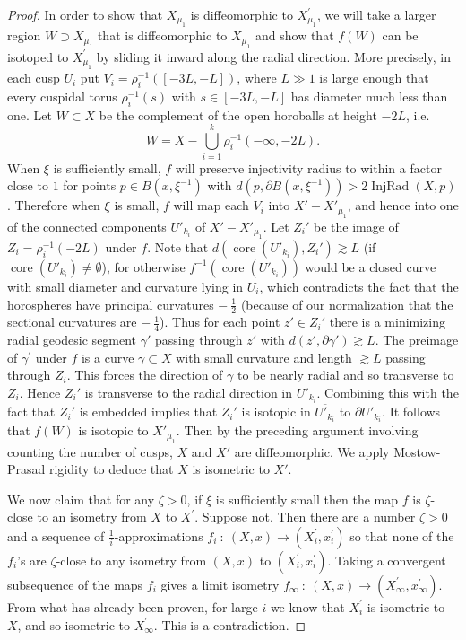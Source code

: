 \documentclass[12pt]{amsart}
\newcommand{\core}{\operatorname{core}}
\newcommand{\D}{\partial}
\newcommand{\injrad}{\operatorname{InjRad}}
\newcommand{\ga}{\gamma}
\newcommand{\ol}{\overline}
\numberwithin{equation}{section}
\theoremstyle{plain}
\theoremstyle{definition}
\theoremstyle{remark}
\begin{document}
\begin{proof}
In order to show that $X_{\mu_1}$ is diffeomorphic to 
$X^\prime_{\mu_1}$, we will take a larger region
$W \supset X_{\mu_1}$ that is diffeomorphic to $X_{\mu_1}$
and show that $f(W)$ can be isotoped to $X^\prime_{\mu_1}$
by sliding it inward along the radial direction. More precisely,
in each cusp
$U_i$ put $V_i= \rho_i^{-1}([-3L,-L])$,
where $L\gg 1$ is large enough that  every cuspidal torus
$\rho_i^{-1}(s)$ with $s\in [-3L,-L]$ has diameter much less than one. 
Let $W\subset X$ be the complement of the open horoballs
at height $-2L$, i.e. 
\begin{equation}
W= X -  \bigcup_{i=1}^k  \rho_i^{-1}(-\infty, -2L).
\end{equation}
When $\xi$ 
is sufficiently small, $f$ will preserve injectivity radius
to within a factor close to $1$ for points $p\in B(x,\xi^{-1})$
with $d(p,\D B(x,\xi^{-1}))>2\injrad(X,p)$.  Therefore
when $\xi$ is small, $f$ will map each $V_i$ into 
 $X' -  X'_{\mu_1}$, and hence into one of the
connected components $U'_{k_i}$ of $X' -  X'_{\mu_1}$.
Let $Z_i'$ be the image of $Z_i=\rho_i^{-1}(-2L)$ under $f$.   Note that
$d(\core(U'_{k_i}),Z_i')\gtrsim L$ (if $\core(U'_{k_i}) \neq
\emptyset$), for otherwise 
$f^{-1}(\core(U'_{k_i}))$ would be a closed curve with 
small diameter and curvature lying in $U_i$, which contradicts
the fact that the horospheres have principal curvatures
$- \: \frac12$ (because of our normalization that the sectional curvatures are
$- \: \frac14$). Thus
for each point $z'\in Z_i'$ there is a minimizing radial 
geodesic segment $\ga'$ passing through $z'$ with
$d(z',\D\ga')\gtrsim L$.  The preimage of $\gamma^\prime$ under $f$ is
a curve $\ga\subset X$ with small curvature and length $\gtrsim L$
passing through $Z_i$. This forces the direction of $\ga$
to be nearly radial
and so transverse to $Z_i$.
Hence $Z_i'$ is transverse to the radial direction in
$U'_{k_i}$.  Combining this with the  fact that $Z_i'$ is
embedded  implies that $Z_i'$ is isotopic in $\ol{U'_{k_i}}$ to 
$\D U'_{k_i}$.  It follows that $f(W)$
is isotopic to $X'_{\mu_1}$. Then by the preceding argument
involving counting the number of cusps,
$X$ and $X'$ are diffeomorphic.
We apply Mostow-Prasad rigidity \cite{Mostow,Prasad} to deduce that
$X$ is isometric to $X'$.

We now claim that for any $\zeta > 0$, if $\xi$
is sufficiently small then the map $f$ is $\zeta$-close to an 
isometry from $X$ to $X^\prime$. Suppose not.  Then there are a number $\zeta > 0$ and
a sequence of $\frac{1}{i}$-approximations $f_i \: : \: (X, x) \rightarrow (X^\prime_i, x^\prime_i)$
so that none of the $f_i$'s are $\zeta$-close to  
any 
isometry from
$(X, x)$ to $(X^\prime_i, x^\prime_i)$. Taking a convergent subsequence of
the maps $f_i$ gives a limit isometry
$f_\infty \: : \: (X, x) \rightarrow (X^\prime_\infty, x^\prime_\infty)$.
From what has already been proven,
for large $i$ we know that $X^\prime_i$ is isometric to $X$, and so isometric
to $X^\prime_\infty$.
This is a contradiction.
\end{proof}
\end{document}
